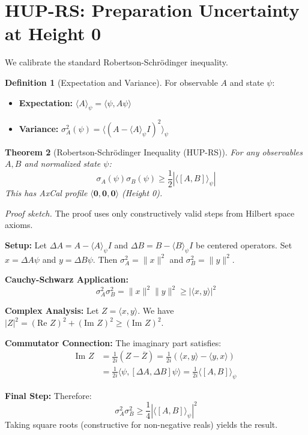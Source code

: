 \documentclass[11pt]{article}
\newcommand{\hzero}{\mathbf{0}}
\newcommand{\allzero}{\langle \hzero,\hzero,\hzero\rangle}
\newcommand{\leanok}{\text{\tiny [✓ Lean]}}
\newcommand{\ip}[2]{\langle #1, #2 \rangle}
\newcommand{\expect}[1]{\langle #1 \rangle}
\newcommand{\comm}[2]{[#1, #2]}
\newcommand{\stddev}{\sigma}
\theoremstyle{plain}
\newtheorem{theorem}{Theorem}[section]
\theoremstyle{definition}
\newtheorem{definition}[theorem]{Definition}
\theoremstyle{remark}
\newenvironment{prfsketch}{\noindent\textit{Proof sketch.} }{}
\begin{document}
\section{HUP-RS: Preparation Uncertainty at Height 0}

We calibrate the standard Robertson-Schrödinger inequality.

\begin{definition}[Expectation and Variance]
For observable $A$ and state $\psi$:
\begin{itemize}
\item \textbf{Expectation:} $\expect{A}_\psi = \ip{\psi}{A\psi}$
\item \textbf{Variance:} $\stddev_A^2(\psi) = \expect{(A - \expect{A}_\psi I)^2}_\psi$
\end{itemize}
\end{definition}

\begin{theorem}[Robertson-Schrödinger Inequality (HUP-RS)] \leanok
For any observables $A, B$ and normalized state $\psi$:
\[
\stddev_A(\psi) \stddev_B(\psi) \geq \frac{1}{2} \left| \expect{\comm{A}{B}}_\psi \right|
\]
This has AxCal profile $\allzero$ (Height 0).
\end{theorem}

\begin{prfsketch}
The proof uses only constructively valid steps from Hilbert space axioms.

\textbf{Setup:} Let $\Delta A = A - \expect{A}_\psi I$ and $\Delta B = B - \expect{B}_\psi I$ be centered operators. 
Set $x = \Delta A \psi$ and $y = \Delta B \psi$. Then $\stddev_A^2 = \|x\|^2$ and $\stddev_B^2 = \|y\|^2$.

\textbf{Cauchy-Schwarz Application:}
\[
\stddev_A^2 \stddev_B^2 = \|x\|^2 \|y\|^2 \geq |\ip{x}{y}|^2
\]

\textbf{Complex Analysis:} Let $Z = \ip{x}{y}$. We have $|Z|^2 = (\text{Re } Z)^2 + (\text{Im } Z)^2 \geq (\text{Im } Z)^2$.

\textbf{Commutator Connection:} The imaginary part satisfies:
\begin{align}
\text{Im } Z &= \frac{1}{2i}(Z - \overline{Z}) = \frac{1}{2i}(\ip{x}{y} - \ip{y}{x}) \\
&= \frac{1}{2i}\ip{\psi}{[\Delta A, \Delta B]\psi} = \frac{1}{2i}\expect{\comm{A}{B}}_\psi
\end{align}

\textbf{Final Step:} Therefore:
\[
\stddev_A^2 \stddev_B^2 \geq \frac{1}{4}|\expect{\comm{A}{B}}_\psi|^2
\]
Taking square roots (constructive for non-negative reals) yields the result.
\end{prfsketch}
\end{document}
